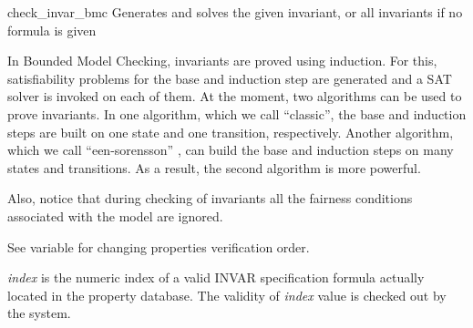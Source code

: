 \begin{nusmvCommand}{check\_invar\_bmc}{\label{checkInvarBmcCommand}
Generates and solves the given invariant, or all invariants if no
 formula is given}
 

In Bounded Model Checking, invariants are proved using induction. For
this, satisfiability problems for the base and induction step are
generated and a SAT solver is invoked on each of them. At the moment,
two algorithms can be used to prove invariants. In one algorithm,
which we call ``classic'', the base and induction steps are built on
one state and one transition, respectively.  Another algorithm, which
we call ``een-sorensson'' \cite{een04temporal}, can build the base and
induction steps on many states and transitions. As a result, the
second algorithm is more powerful.

Also, notice that during checking of invariants all the fairness
conditions associated with the model are ignored.

See variable  for changing properties
verification order.
\begin{cmdOpt}

 { {\it index} is the numeric
index of a valid INVAR specification formula actually located in the
property database.  The validity of {\it index} value is checked out
by the system.}
       

            




\end{cmdOpt}
\end{nusmvCommand}
